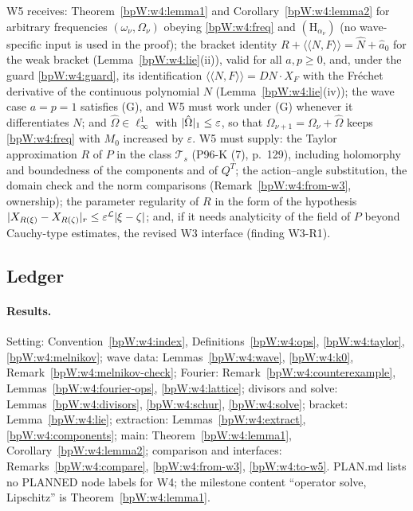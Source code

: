 \begin{remark}[To W5]\label{bpW:w4:to-w5}
W5 receives: Theorem~\ref{bpW:w4:lemma1} and Corollary~\ref{bpW:w4:lemma2} for arbitrary frequencies
$(\omega_\nu,\Omega_\nu)$ obeying \eqref{bpW:w4:freq} and $(\mathrm H_{\alpha_\nu})$ (no wave-specific input is used in
the proof); the bracket identity $R+\langle\!\langle N,F\rangle\!\rangle=\hat N+\hat a_0$ for the weak bracket
(Lemma~\ref{bpW:w4:lie}(ii)), valid for all $a,p\ge0$, and, under the guard \eqref{bpW:w4:guard}, its identification
$\langle\!\langle N,F\rangle\!\rangle=DN\cdot X_F$ with the Fr\'echet derivative of the continuous polynomial $N$
(Lemma~\ref{bpW:w4:lie}(iv)); the wave case $a=p=1$ satisfies (G), and W5 must work under (G) whenever it
differentiates $N$; and $\hat\Omega\in\ell^1_\infty$ with $\lvert \hat\Omega\rvert_1\le\varepsilon$, so that
$\Omega_{\nu+1}=\Omega_\nu+\hat\Omega$ keeps \eqref{bpW:w4:freq} with $M_0$ increased by $\varepsilon$. W5 must supply:
the Taylor approximation $R$ of $P$ in the class $\mathcal T_s$ (P96-K (7), p.~129), including holomorphy and boundedness
of the components and of $Q^T$; the action--angle substitution, the domain check and the norm comparisons
(Remark~\ref{bpW:w4:from-w3}, ownership); the parameter regularity of $R$ in the form of the hypothesis
$\lvert X_{R(\xi)}-X_{R(\zeta)}\rvert_r\le\varepsilon^{\mathcal L}\lvert \xi-\zeta\rvert$; and, if it needs analyticity of the field of $P$
beyond Cauchy-type estimates, the revised W3 interface (finding W3-R1).
\end{remark}

\subsection{Ledger}\label{bpW:w4:ledger}

\paragraph{Results.} Setting: Convention~\ref{bpW:w4:index}, Definitions~\ref{bpW:w4:ops}, \ref{bpW:w4:taylor},
\ref{bpW:w4:melnikov}; wave data: Lemmas~\ref{bpW:w4:wave}, \ref{bpW:w4:k0}, Remark~\ref{bpW:w4:melnikov-check};
Fourier: Remark~\ref{bpW:w4:counterexample}, Lemmas~\ref{bpW:w4:fourier-ops}, \ref{bpW:w4:lattice}; divisors and solve:
Lemmas~\ref{bpW:w4:divisors}, \ref{bpW:w4:schur}, \ref{bpW:w4:solve}; bracket: Lemma~\ref{bpW:w4:lie}; extraction:
Lemmas~\ref{bpW:w4:extract}, \ref{bpW:w4:components}; main: Theorem~\ref{bpW:w4:lemma1}, Corollary~\ref{bpW:w4:lemma2};
comparison and interfaces: Remarks~\ref{bpW:w4:compare}, \ref{bpW:w4:from-w3}, \ref{bpW:w4:to-w5}. PLAN.md lists no
PLANNED node labels for W4; the milestone content ``operator solve, Lipschitz'' is Theorem~\ref{bpW:w4:lemma1}.

